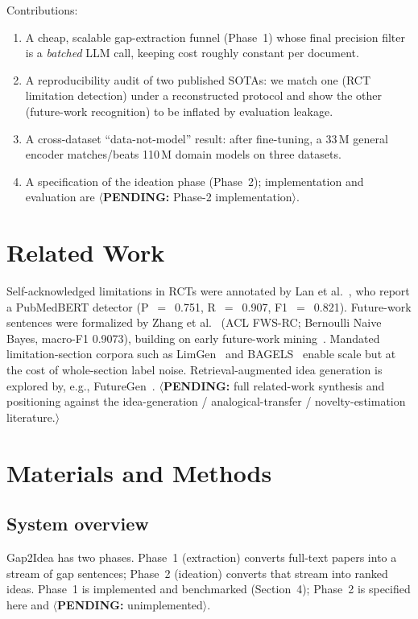 \documentclass[10pt,a4paper]{article}
\newcommand{\pending}[1]{\textcolor{red!80!black}{$\langle$\textbf{PENDING:} #1$\rangle$}}
\newcommand{\done}[1]{\textcolor{green!45!black}{#1}}
\begin{document}
Contributions:
\begin{enumerate}[leftmargin=1.4em,itemsep=1pt]
  \item \done{A cheap, scalable gap-extraction funnel (Phase~1)} whose final precision filter is
  a \emph{batched} LLM call, keeping cost roughly constant per document.
  \item \done{A reproducibility audit of two published SOTAs}: we match one (RCT limitation
  detection) under a reconstructed protocol and show the other (future-work recognition) to be
  inflated by evaluation leakage.
  \item \done{A cross-dataset ``data-not-model'' result}: after fine-tuning, a 33\,M general
  encoder matches/beats 110\,M domain models on three datasets.
  \item A specification of the ideation phase (Phase~2); implementation and evaluation are
  \pending{Phase-2 implementation}.
\end{enumerate}

\section{Related Work}
Self-acknowledged limitations in RCTs were annotated by Lan et al.~\citep{rctlimits}, who report
a PubMedBERT detector (P~$=$~0.751, R~$=$~0.907, F1~$=$~0.821). Future-work sentences were
formalized by Zhang et al.~\citep{zhangfws2022} (ACL FWS-RC; Bernoulli Naive Bayes, macro-F1
0.9073), building on early future-work mining~\citep{huwan2015}. Mandated limitation-section
corpora such as LimGen~\citep{limgen2024} and BAGELS~\citep{bagels} enable scale but at the cost
of whole-section label noise. Retrieval-augmented idea generation is explored by, e.g.,
FutureGen~\citep{futuregen2025}. \pending{full related-work synthesis and positioning against the
idea-generation / analogical-transfer / novelty-estimation literature.}

\section{Materials and Methods}
\subsection{System overview}
Gap2Idea has two phases. Phase~1 (extraction) converts full-text papers into a stream of gap
sentences; Phase~2 (ideation) converts that stream into ranked ideas. Phase~1 is implemented and
benchmarked (Section~4); Phase~2 is specified here and \pending{unimplemented}.
\end{document}
